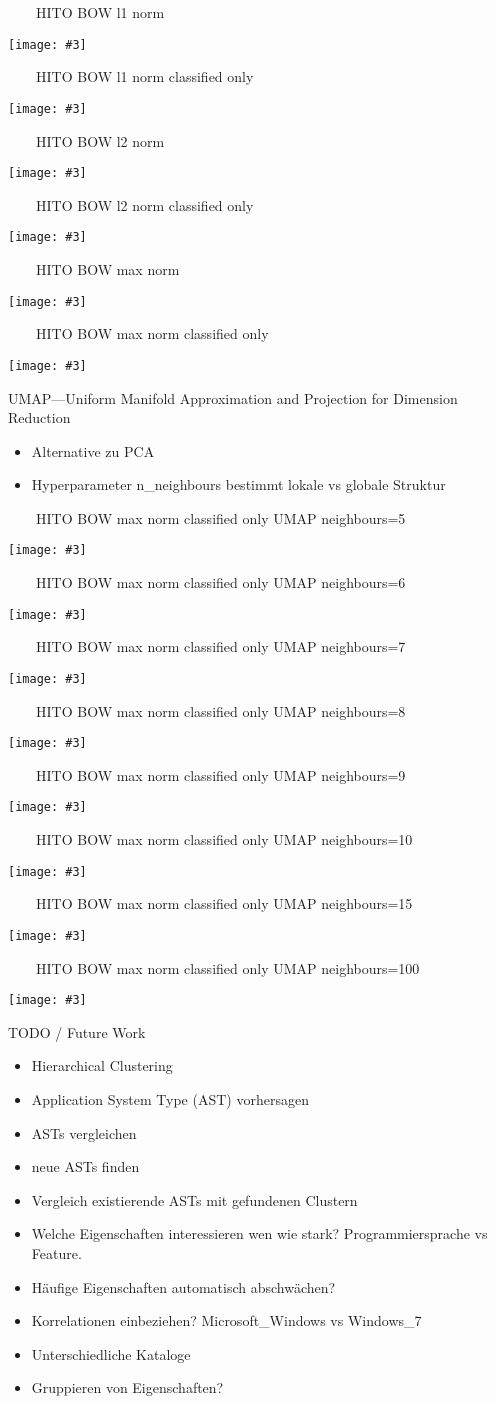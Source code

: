 \documentclass[aspectratio=1610,handout]{beamer}
\newcommand{\imageslide}[4][]
{
\begin{frame}[plain]{~~~~#2}
\vspace{0.2em}
\begin{center}
\centering\texttt{[image: \#3]}
\end{center}
#1
\note{#4}
\end{frame}
}
\begin{document}
\imageslide{HITO BOW l1 norm}{img/cluster-bagofwords-l1.pdf}{}
\imageslide{HITO BOW l1 norm classified only}{img/cluster-bagofwords-classifiedonly-l1.pdf}{}
\imageslide{HITO BOW l2 norm}{img/cluster-bagofwords-l2.pdf}{}
\imageslide{HITO BOW l2 norm classified only}{img/cluster-bagofwords-classifiedonly-l2.pdf}{}
\imageslide{HITO BOW max norm}{img/cluster-bagofwords-max.pdf}{}
\imageslide{HITO BOW max norm classified only}{img/cluster-bagofwords-classifiedonly-max.pdf}{}

\begin{frame}{UMAP---Uniform Manifold Approximation and Projection for Dimension Reduction}
\begin{itemize}
\item Alternative zu PCA
\item Hyperparameter n\_neighbours bestimmt lokale vs globale Struktur
\end{itemize}
\end{frame}

\imageslide{HITO BOW max norm classified only UMAP neighbours=5}{img/cluster-bagofwords-classifiedonly-umap-n5-max.pdf}{}
\imageslide{HITO BOW max norm classified only UMAP neighbours=6}{img/cluster-bagofwords-classifiedonly-umap-n6-max.pdf}{}
\imageslide{HITO BOW max norm classified only UMAP neighbours=7}{img/cluster-bagofwords-classifiedonly-umap-n7-max.pdf}{}
\imageslide{HITO BOW max norm classified only UMAP neighbours=8}{img/cluster-bagofwords-classifiedonly-umap-n8-max.pdf}{}
\imageslide{HITO BOW max norm classified only UMAP neighbours=9}{img/cluster-bagofwords-classifiedonly-umap-n9-max.pdf}{}
\imageslide{HITO BOW max norm classified only UMAP neighbours=10}{img/cluster-bagofwords-classifiedonly-umap-n10-max.pdf}{}
\imageslide{HITO BOW max norm classified only UMAP neighbours=15}{img/cluster-bagofwords-classifiedonly-umap-max.pdf}{}
\imageslide{HITO BOW max norm classified only UMAP neighbours=100}{img/cluster-bagofwords-classifiedonly-umap-n100-max.pdf}{}

\begin{frame}{TODO / Future Work}
\begin{itemize}
\item Hierarchical Clustering
\item Application System Type (AST) vorhersagen
\item ASTs vergleichen
\item neue ASTs finden
\item Vergleich existierende ASTs mit gefundenen Clustern
\pause
\vspace{1em}
\item Welche Eigenschaften interessieren wen wie stark? Programmiersprache vs Feature.
\pause
\item Häufige Eigenschaften automatisch abschwächen?
\pause
\item Korrelationen einbeziehen? Microsoft\_Windows vs Windows\_7
\pause
\item Unterschiedliche Kataloge
\pause
\item Gruppieren von Eigenschaften?
\end{itemize}
\end{frame}
\end{document}
